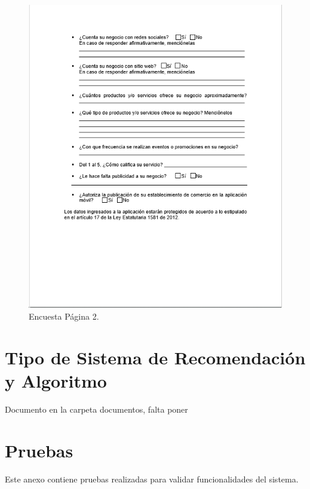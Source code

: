 \documentclass[12pt,letterpaper,openany]{book}
\begin{document}
\begin{figure}[H]
\begin{center}
\includegraphics[width=12cm]{./imagenes/Encuesta2}
\caption{Encuesta Página 2.}
\end{center}
\end{figure}

\chapter{Tipo de Sistema de Recomendación y Algoritmo}\label{aped.E}
Documento en la carpeta documentos, falta poner





\chapter{Pruebas}\label{aped.F}
Este anexo contiene pruebas realizadas para validar funcionalidades del sistema.
\end{document}
